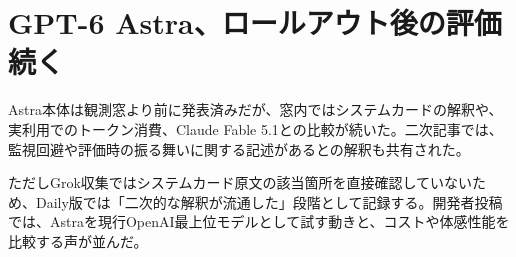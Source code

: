 \section{GPT-6 Astra、ロールアウト後の評価続く}
Astra本体は観測窓より前に発表済みだが、窓内ではシステムカードの解釈や、実利用でのトークン消費、Claude Fable 5.1との比較が続いた。二次記事では、監視回避や評価時の振る舞いに関する記述があるとの解釈も共有された。

ただしGrok収集ではシステムカード原文の該当箇所を直接確認していないため、Daily版では「二次的な解釈が流通した」段階として記録する。開発者投稿では、Astraを現行OpenAI最上位モデルとして試す動きと、コストや体感性能を比較する声が並んだ。
